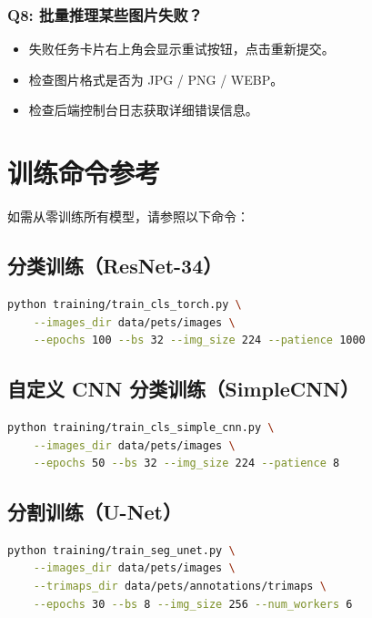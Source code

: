 \documentclass[12pt, a4paper, openany]{ctexbook}
\begin{document}
\subsection*{Q8: 批量推理某些图片失败？}

\begin{itemize}
  \item 失败任务卡片右上角会显示重试按钮，点击重新提交。
  \item 检查图片格式是否为 JPG / PNG / WEBP。
  \item 检查后端控制台日志获取详细错误信息。
\end{itemize}

\chapter{训练命令参考}
\label{ch:training}

如需从零训练所有模型，请参照以下命令：

\section{分类训练（ResNet-34）}

\begin{lstlisting}[language=bash]
python training/train_cls_torch.py \
    --images_dir data/pets/images \
    --epochs 100 --bs 32 --img_size 224 --patience 1000
\end{lstlisting}

\section{自定义 CNN 分类训练（SimpleCNN）}

\begin{lstlisting}[language=bash]
python training/train_cls_simple_cnn.py \
    --images_dir data/pets/images \
    --epochs 50 --bs 32 --img_size 224 --patience 8
\end{lstlisting}

\section{分割训练（U-Net）}

\begin{lstlisting}[language=bash]
python training/train_seg_unet.py \
    --images_dir data/pets/images \
    --trimaps_dir data/pets/annotations/trimaps \
    --epochs 30 --bs 8 --img_size 256 --num_workers 6
\end{lstlisting}
\end{document}
